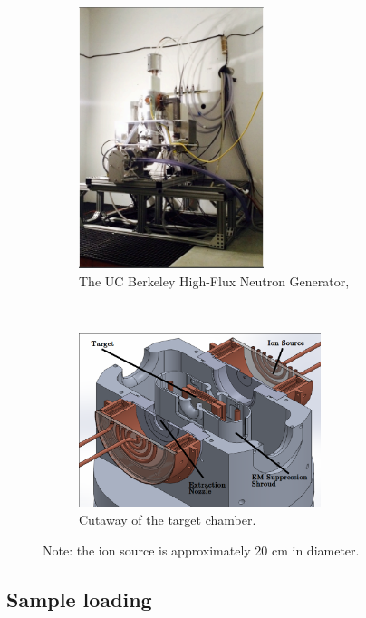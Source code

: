 \documentclass[5p]{elsarticle}
\begin{document}
\begin{figure}
    \centering
    \begin{subfigure}[t]{0.4\textwidth}
        \centering
        \includegraphics[height=3in]{./figures/Capture.PNG}
        \caption{The UC Berkeley High-Flux Neutron Generator,}
        \label{fig:hfng_a}
    \end{subfigure}%
    ~ 
    \begin{subfigure}[t]{0.4\textwidth}
        \centering
        \includegraphics[height=2in]{./figures/target2.png}
        \caption{Cutaway of the target chamber.}
                \label{fig:hfng_b}
    \end{subfigure}
    \caption{Note: the ion source is approximately 20 cm in diameter.}
     \label{fig:main_HFNG}
\end{figure}


\subsection{Sample loading}\label{sec:sample_loading}
\end{document}
